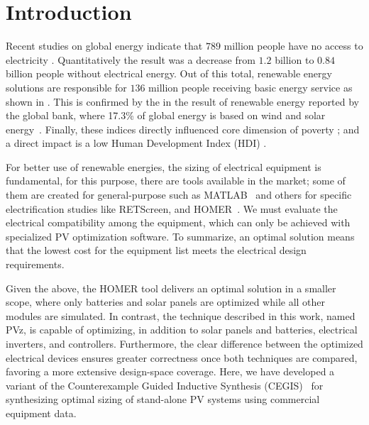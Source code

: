 \documentclass[review]{elsarticle}
\begin{document}

\maketitle

\section{Introduction}
Recent studies on global energy indicate that $789$ million people have no access to electricity \citep{Energyprogressreport}. Quantitatively the result was a decrease from $1.2$ billion to $0.84$ billion people without electrical energy. Out of this total, renewable energy solutions are responsible for $136$ million people receiving basic energy service as shown in \cite{Energyprogressreport}. This is confirmed by the in the result of renewable energy reported by the global bank, where 17.3\% of global energy is based on wind and solar energy~\citep{Energyprogressreport}. Finally, these indices directly influenced core dimension of poverty \citep{Hussein2012}; and a direct impact is a low Human Development Index (HDI) \citep{Coelho}. 

For better use of renewable energies, the sizing of electrical equipment is fundamental, for this purpose, there are tools available in the market; some of them are created for general-purpose such as MATLAB~\citep{Benatiallah2017} and others for specific electrification studies like RETScreen, and HOMER~\citep{Pradhan,Swarnkar}. We must evaluate the electrical compatibility among the equipment, which can only be achieved with specialized PV optimization software. To summarize, an optimal solution means that the lowest cost for the equipment list meets the electrical design requirements. 

Given the above, the HOMER tool delivers an optimal solution in a smaller scope, where only batteries and solar panels are optimized while all other modules are simulated. In contrast, the technique described in this work, named PVz, is capable of optimizing, in addition to solar panels and batteries, electrical inverters, and controllers. Furthermore, the clear difference between the optimized electrical devices ensures greater correctness once both techniques are compared, favoring a more extensive design-space coverage. Here, we have developed a variant of the Counterexample Guided Inductive Synthesis (CEGIS)~\citep{AbateCAV2018} for synthesizing optimal sizing of stand-alone PV systems using commercial equipment data. 
\end{document}

